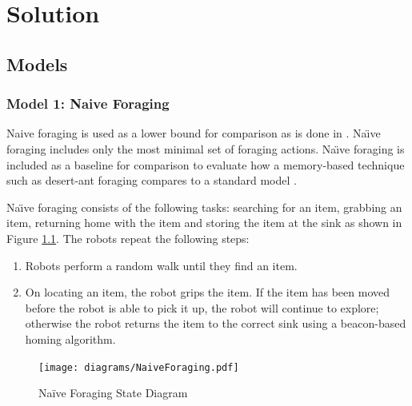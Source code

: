 
\chapter{Solution}
\label{chap:third}




\section{Models}


 
\subsection{Model 1: Naive Foraging}

Naive foraging is used as a lower bound for comparison as is done in \cite{62} \cite{63}. Na\"\i ve foraging includes only the most minimal set of foraging actions. Na\"\i ve foraging is included as a baseline for comparison to evaluate how a memory-based technique such as desert-ant foraging compares to a standard model \cite{ostergaard2001emergent,hoff2010two}.

 Na\"\i ve foraging consists of the following tasks: searching for an item, grabbing an item, returning home with the item and storing the item at the sink as shown in Figure \ref{naiveforagestate}. The robots repeat the following steps: 

\begin{enumerate}
	\item Robots perform a random walk until they find an item.
	\item On locating an item, the robot grips the item. If the item has been moved before the robot is able to pick it up, the robot will continue to explore; otherwise the robot returns the item to the correct sink using a beacon-based homing algorithm.
\end{enumerate}
\begin{figure}
	\centering
	\texttt{[image: diagrams/NaiveForaging.pdf]}
	\caption{Na\"ive Foraging State Diagram}
	\label{naiveforagestate}
\end{figure}

